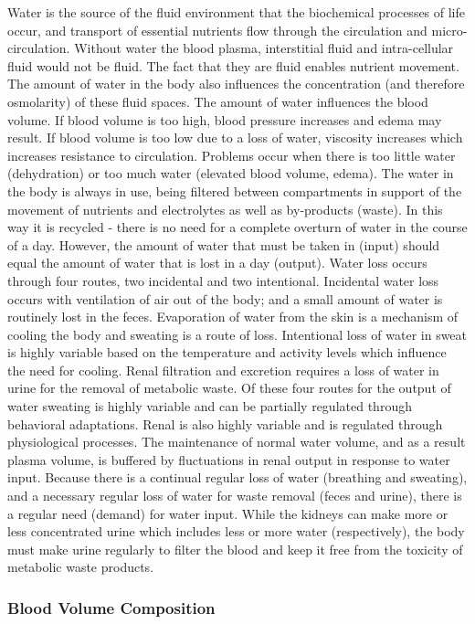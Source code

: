 Water is the source of the fluid environment that the biochemical processes of life occur, and transport of essential nutrients flow through the circulation and micro-circulation. Without water the blood plasma, interstitial fluid and intra-cellular fluid would not be fluid. The fact that they are fluid enables nutrient movement. The amount of water in the body also influences the concentration (and therefore osmolarity) of these fluid spaces. The amount of water influences the blood volume. If blood volume is too high, blood pressure increases and edema may result. If blood volume is too low due to a loss of water, viscosity increases which increases resistance to circulation. Problems occur when there is too little water (dehydration) or too much water (elevated blood volume, edema). The water in the body is always in use, being filtered between compartments in support of the movement of nutrients and electrolytes as well as by-products (waste). In this way it is recycled - there is no need for a complete overturn of water in the course of a day. However, the amount of water that must be taken in (input) should equal the amount of water that is lost in a day (output). Water loss occurs through four routes, two incidental and two intentional. Incidental water loss occurs with ventilation of air out of the body; and a small amount of water is routinely lost in the feces. Evaporation of water from the skin is a mechanism of cooling the body and sweating is a route of loss. Intentional loss of water in sweat is highly variable based on the temperature and activity levels which influence the need for cooling. Renal filtration and excretion requires a loss of water in urine for the removal of metabolic waste. Of these four routes for the output of water sweating is highly variable and can be partially regulated through behavioral adaptations. Renal is also highly variable and is regulated through physiological processes. The maintenance of normal water volume, and as a result plasma volume, is buffered by fluctuations in renal output in response to water input. Because there is a continual regular loss of water (breathing and sweating), and a necessary regular loss of water for waste removal (feces and urine), there is a regular need (demand) for water input. While the kidneys can make more or less concentrated urine which includes less or more water (respectively), the body must make urine regularly to filter the blood and keep it free from the toxicity of metabolic waste products.

\subsubsection{Blood Volume Composition}

